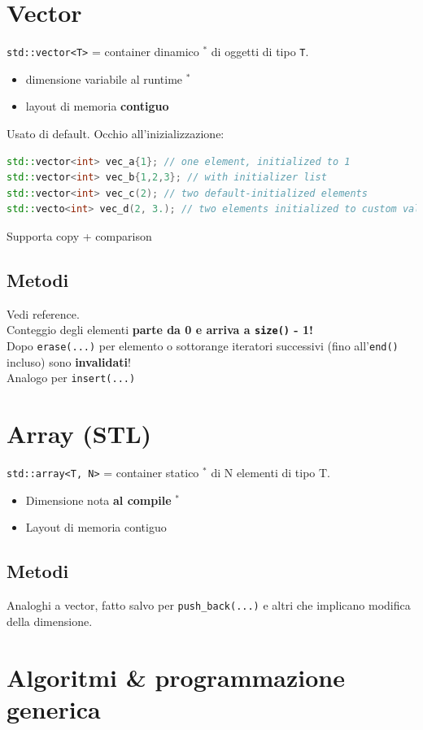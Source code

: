 \documentclass[10pt, oneside]{book}
\begin{document}
\section{Vector}
\texttt{std::vector<T>} = container dinamico $\mathbf{^\ast}$ di oggetti di tipo \texttt{T}.
\begin{itemize}
\item dimensione variabile al runtime $\mathbf{^\ast}$
\item layout di memoria \textbf{contiguo}
\end{itemize}
Usato di default. Occhio all'inizializzazione:
\begin{lstlisting}[language=C++]
std::vector<int> vec_a{1}; // one element, initialized to 1
std::vector<int> vec_b{1,2,3}; // with initializer list
std::vector<int> vec_c(2); // two default-initialized elements
std::vecto<int> vec_d(2, 3.); // two elements initialized to custom value 3.
\end{lstlisting}
Supporta copy + comparison

\subsection{Metodi}
Vedi reference.\\
Conteggio degli elementi \textbf{parte da 0 e arriva a \texttt{size()} - 1!}\\
Dopo \texttt{erase(...)} per elemento o sottorange iteratori successivi (fino all'\texttt{end()} incluso) sono \textbf{invalidati}!\\
Analogo per \texttt{insert(...)}

\section{Array (STL)}
\texttt{std::array<T, N>} = container statico $\mathbf{^\ast}$ di N elementi di tipo T.
\begin{itemize}
\item Dimensione nota \textbf{al compile} $\mathbf{^\ast}$
\item Layout di memoria contiguo
\end{itemize}

\subsection{Metodi}
Analoghi a vector, fatto salvo per \texttt{push\_back(...)} e altri che implicano modifica della dimensione.

\section{Algoritmi \& programmazione generica}
\end{document}
